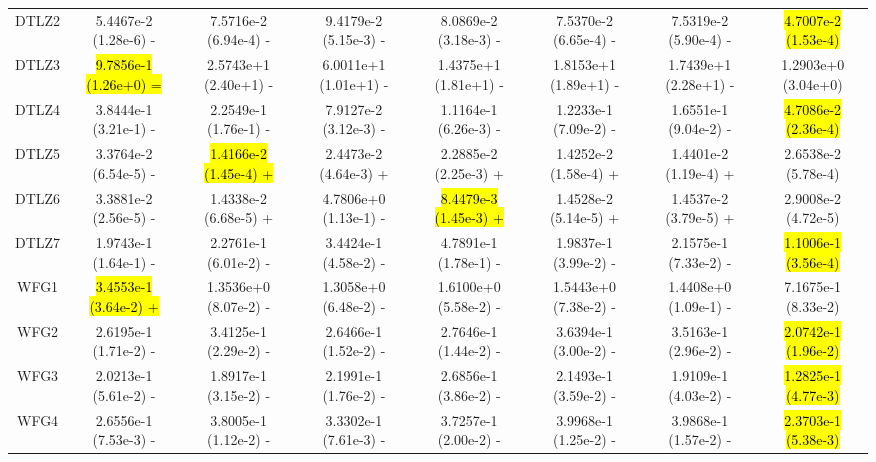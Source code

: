 \documentclass[journal]{IEEEtran}
\begin{document}
\begin{table}[tbp]
{\begin{tabular}{cccccccc}
            DTLZ2   & 5.4467e-2 (1.28e-6) -      & 7.5716e-2 (6.94e-4) -      & 9.4179e-2 (5.15e-3) -      & 8.0869e-2 (3.18e-3) -      & 7.5370e-2 (6.65e-4) -      & 7.5319e-2 (5.90e-4) -      & \hl{4.7007e-2 (1.53e-4)} \\
            DTLZ3   & \hl{9.7856e-1 (1.26e+0) =} & 2.5743e+1 (2.40e+1) -      & 6.0011e+1 (1.01e+1) -      & 1.4375e+1 (1.81e+1) -      & 1.8153e+1 (1.89e+1) -      & 1.7439e+1 (2.28e+1) -      & 1.2903e+0 (3.04e+0)      \\
            DTLZ4   & 3.8444e-1 (3.21e-1) -      & 2.2549e-1 (1.76e-1) -      & 7.9127e-2 (3.12e-3) -      & 1.1164e-1 (6.26e-3) -      & 1.2233e-1 (7.09e-2) -      & 1.6551e-1 (9.04e-2) -      & \hl{4.7086e-2 (2.36e-4)} \\
            DTLZ5   & 3.3764e-2 (6.54e-5) -      & \hl{1.4166e-2 (1.45e-4) +} & 2.4473e-2 (4.64e-3) +      & 2.2885e-2 (2.25e-3) +      & 1.4252e-2 (1.58e-4) +      & 1.4401e-2 (1.19e-4) +      & 2.6538e-2 (5.78e-4)      \\
            DTLZ6   & 3.3881e-2 (2.56e-5) -      & 1.4338e-2 (6.68e-5) +      & 4.7806e+0 (1.13e-1) -      & \hl{8.4479e-3 (1.45e-3) +} & 1.4528e-2 (5.14e-5) +      & 1.4537e-2 (3.79e-5) +      & 2.9008e-2 (4.72e-5)      \\
            DTLZ7   & 1.9743e-1 (1.64e-1) -      & 2.2761e-1 (6.01e-2) -      & 3.4424e-1 (4.58e-2) -      & 4.7891e-1 (1.78e-1) -      & 1.9837e-1 (3.99e-2) -      & 2.1575e-1 (7.33e-2) -      & \hl{1.1006e-1 (3.56e-4)} \\
            \hline
            WFG1    & \hl{3.4553e-1 (3.64e-2) +} & 1.3536e+0 (8.07e-2) -      & 1.3058e+0 (6.48e-2) -      & 1.6100e+0 (5.58e-2) -      & 1.5443e+0 (7.38e-2) -      & 1.4408e+0 (1.09e-1) -      & 7.1675e-1 (8.33e-2)      \\
            WFG2    & 2.6195e-1 (1.71e-2) -      & 3.4125e-1 (2.29e-2) -      & 2.6466e-1 (1.52e-2) -      & 2.7646e-1 (1.44e-2) -      & 3.6394e-1 (3.00e-2) -      & 3.5163e-1 (2.96e-2) -      & \hl{2.0742e-1 (1.96e-2)} \\
            WFG3    & 2.0213e-1 (5.61e-2) -      & 1.8917e-1 (3.15e-2) -      & 2.1991e-1 (1.76e-2) -      & 2.6856e-1 (3.86e-2) -      & 2.1493e-1 (3.59e-2) -      & 1.9109e-1 (4.03e-2) -      & \hl{1.2825e-1 (4.77e-3)} \\
            WFG4    & 2.6556e-1 (7.53e-3) -      & 3.8005e-1 (1.12e-2) -      & 3.3302e-1 (7.61e-3) -      & 3.7257e-1 (2.00e-2) -      & 3.9968e-1 (1.25e-2) -      & 3.9868e-1 (1.57e-2) -      & \hl{2.3703e-1 (5.38e-3)} \\

\end{tabular}}
\end{table}
\end{document}
